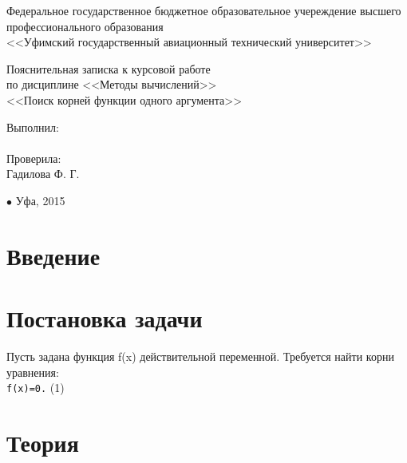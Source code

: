 \documentclass{article}
\author{Пахтусов Н. Г., ПРО-306}
\begin{document}
\begin{center}
\thispagestyle{empty} 

Федеральное государственное бюджетное образовательное учереждение высшего \\
профессионального образования\\
<<Уфимский государственный авиационный технический университет>>
\vspace*{\fill}
\begingroup
\centering

Пояснительная записка к курсовой работе\\
по дисциплине <<Методы вычислений>>\\
<<Поиск корней функции одного аргумента>>

\endgroup
\vspace*{\fill}

\end{center}

\begin{flushright}

Выполнил:\\
\@author \\
Проверила:\\
Гадилова Ф. Г.

\end{flushright}

\begin{center}
$\bullet$ Уфа, 2015
\end{center}

\clearpage

\tableofcontents

\clearpage

\section{Введение}

\section{Постановка задачи}

	Пусть задана функция f(x) действительной переменной. Требуется найти корни уравнения:\\
	
	\texttt{f(x)=0.} (1)
	
	

\section{Теория}
\end{document}
